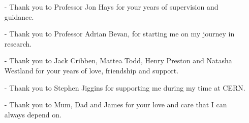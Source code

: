 \clearpage


\begin{acknowledgements}
  \begin{itemize}
  \item[-] Thank you to Professor Jon Hays for your years of supervision and guidance.
  \item[-] Thank you to Professor Adrian Bevan, for starting me on my journey in
    research.
  \item[-] Thank you to Jack Cribben, Mattea Todd, Henry Preston and Natasha
    Westland for your years of love, friendship and support.
  \item[-] Thank you to Stephen Jiggins for supporting me during my time at CERN.
  \item[-] Thank you to Mum, Dad and James for your love and care that I can
    always depend on.
  \end{itemize}
\end{acknowledgements}

\clearpage